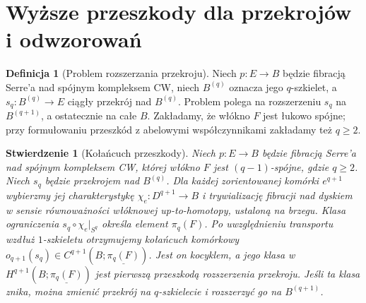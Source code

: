 \documentclass[11pt,a4paper,oneside]{report}
\theoremstyle{plain}
\newtheorem{stwierdzenie}[twierdzenie]{Stwierdzenie}
\theoremstyle{definition}
\newtheorem{definicja}[twierdzenie]{Definicja}
\theoremstyle{remark}
\begin{document}
\section{Wyższe przeszkody dla przekrojów i odwzorowań}
\begin{definicja}[Problem rozszerzania przekroju]
Niech $p:E\to B$ będzie fibracją Serre'a nad spójnym kompleksem CW,
niech $B^{(q)}$ oznacza jego $q$-szkielet, a $s_q:B^{(q)}\to E$
ciągły przekrój nad $B^{(q)}$. Problem polega na rozszerzeniu
$s_q$ na $B^{(q+1)}$, a ostatecznie na całe $B$.
Zakładamy, że włókno $F$ jest łukowo spójne; przy formułowaniu
przeszkód z abelowymi współczynnikami zakładamy też $q\ge2$.
\end{definicja}
\begin{stwierdzenie}[Kołańcuch przeszkody]
\label{prop:xviii-obstruction}
Niech $p:E\to B$ będzie fibracją Serre'a nad spójnym
kompleksem CW, której włókno $F$ jest $(q-1)$-spójne,
gdzie $q\ge2$. Niech $s_q$ będzie przekrojem nad $B^{(q)}$.
Dla każdej zorientowanej komórki $e^{q+1}$ wybierzmy
jej charakterystykę $\chi_e:D^{q+1}\to B$ i trywializację
fibracji nad dyskiem w sensie równoważności włóknowej
up-to-homotopy, ustaloną na brzegu. Klasa ograniczenia
$s_q\circ\chi_e|_{S^q}$ określa element $\pi_q(F)$.
Po uwzględnieniu transportu wzdłuż $1$-szkieletu otrzymujemy
kołańcuch komórkowy
$o_{q+1}(s_q)\in C^{q+1}(B;\underline{\pi_q(F)})$.
Jest on kocyklem, a jego klasa w
$H^{q+1}(B;\underline{\pi_q(F)})$ jest pierwszą przeszkodą
rozszerzenia przekroju. Jeśli ta klasa znika, można zmienić
przekrój na $q$-szkielecie i rozszerzyć go na $B^{(q+1)}$.
\end{stwierdzenie}
\end{document}
